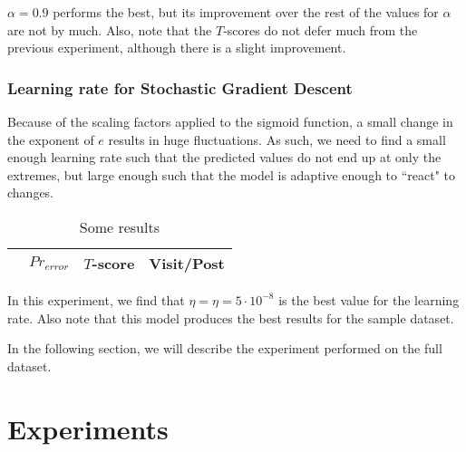 $\alpha=0.9$ performs the best, but its improvement over the rest of the values 
for $\alpha$ are not by much. Also, note that the $T$-scores do not defer much 
from the previous experiment, although there is a slight improvement.

\subsubsection{Learning rate for Stochastic Gradient Descent}

Because of the scaling factors applied to the sigmoid function, a small change 
in the exponent of $e$ results in huge fluctuations. As such, we need to find a 
small enough learning rate such that the predicted values do not end up at only 
the extremes, but large enough such that the model is adaptive enough to 
``react" to changes.

\begin{table}
\begin{center}
\begin{tabular}{| l | c | c | c |}
\hline
		& $Pr_{error}$		  & $T$-score			   &	Visit/Post\\
\hline
	
\hline
\end{tabular}
\end{center}
\caption{Some results}\label{tbl:par_tune_learning}
\end{table}

In this experiment, we find that $\eta = \eta=5\cdot10^{-8}$ is the best value 
for the learning rate. Also note that this model produces the best results for 
the sample dataset.

In the following section, we will describe the experiment performed on the full 
dataset.

\section{Experiments}
